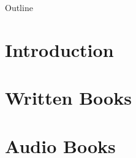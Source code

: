 \documentclass[
    NAME={Dr. Helga Ingimundardóttir},
    EMAIL={helgaingim@hi.is},
    FACULTY={Industrial Engineering},
    TITLE={Pushing Boundaries: A Data-Driven Dive into `Legend of the Ice People'},
    SUBTITLE={Unravel the unexpected synergy of literature and data science},
    SEMINAR={Haustráðstefna Advania},
    DATE={September 8, 2023}
    ]{hi-latex/hi-beamer}
\begin{document}
\begin{frame}{Outline}
  \tableofcontents
\end{frame}

\section{Introduction}


\section{Written Books}


\section{Audio Books}

\end{document}
